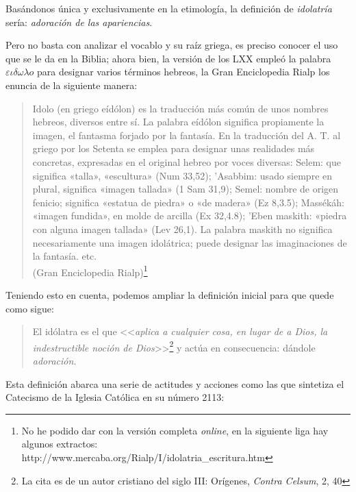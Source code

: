 \documentclass{article}
\begin{document}
Bas\'andonos \'unica y exclusivamente en la etimolog\'{i}a, la definici\'on de \emph{idolatr\'{i}a} ser\'{i}a: \emph{adoraci\'on de las apariencias}.

Pero no basta con analizar el vocablo y su ra\'{i}z griega, es preciso conocer el uso que se le da en la Biblia; ahora bien, la versi\'on de los LXX emple\'o la palabra $\varepsilon\iota\delta\omega\lambda o$ para designar varios t\'erminos hebreos, la Gran Enciclopedia Rialp los enuncia de la siguiente manera:

\begin{quote}
Idolo (en griego eídólon) es la traducción más común de unos nombres hebreos, diversos entre sí. La palabra eídólon significa propiamente la imagen, el fantasma forjado por la fantasía. En la traducción del A. T. al griego por los Setenta se emplea para designar unas realidades más concretas, expresadas en el original hebreo por voces diversas: Selem: que significa «talla», «escultura» (Num 33,52); 'Asabbim: usado siempre en plural, significa «imagen tallada» (1 Sam 31,9); Semel: nombre de origen fenicio; significa «estatua de piedra» o «de madera» (Ez 8,3.5); Massékáh: «imagen fundida», en molde de arcilla (Ex 32,4.8); 'Eben maskith: «piedra con alguna imagen tallada» (Lev 26,1). La palabra maskith no significa necesariamente una imagen idolátrica; puede designar las imaginaciones de la fantasía. etc.\\
(Gran Enciclopedia Rialp)\footnote{No he podido dar con la versi\'on completa \emph{online}, en la siguiente liga hay algunos extractos: http://www.mercaba.org/Rialp/I/idolatria\_escritura.htm}
\end{quote}

\noindent
Teniendo esto en cuenta, podemos ampliar la definici\'on inicial para que quede como sigue:

\begin{quote}
El idólatra es el que <<\emph{aplica a cualquier cosa, en lugar de a Dios, la indestructible noción de Dios}>>\footnote{La cita es de un autor cristiano del siglo III: Orígenes, \emph{Contra Celsum}, 2, 40} y act\'ua en consecuencia: d\'andole \emph{adoraci\'on}.
\end{quote}

\noindent
Esta definici\'on abarca una serie de actitudes y acciones como las que sintetiza el Catecismo de la Iglesia Cat\'olica en su n\'umero 2113:
\end{document}

